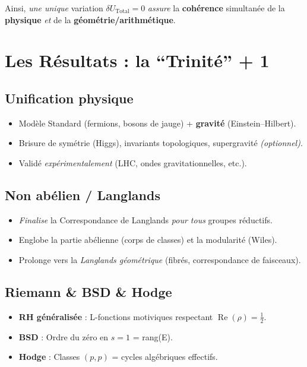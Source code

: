 \documentclass[11pt]{article}
\begin{document}
\noindent
Ainsi, \emph{une unique} variation
\(\delta U_{\mathrm{Total}}=0\)
\emph{assure} la \textbf{cohérence} simultanée de la \textbf{physique} \emph{et} de la \textbf{géométrie/arithmétique}.

\section{Les Résultats : la “Trinité” + 1}

\subsection{Unification physique}
\begin{itemize}
  \item Modèle Standard (fermions, bosons de jauge) + \textbf{gravité} (Einstein--Hilbert).
  \item Brisure de symétrie (Higgs), invariants topologiques, supergravité \emph{(optionnel)}.
  \item Validé \emph{expérimentalement} (LHC, ondes gravitationnelles, etc.).
\end{itemize}

\subsection{Non abélien / Langlands}
\begin{itemize}
  \item \emph{Finalise} la Correspondance de Langlands \emph{pour tous} groupes réductifs.
  \item Englobe la partie abélienne (corps de classes) et la modularité (Wiles).
  \item Prolonge vers la \emph{Langlands géométrique} (fibrés, correspondance de faisceaux).
\end{itemize}

\subsection{Riemann \& BSD \& Hodge}
\begin{itemize}
  \item \textbf{RH généralisée} : L-fonctions motiviques respectant \(\operatorname{Re}(\rho)=\tfrac12\).
  \item \textbf{BSD} : Ordre du zéro en $s=1$ = rang(E).
  \item \textbf{Hodge} : Classes \((p,p)\) = cycles algébriques effectifs.
\end{itemize}
\end{document}
